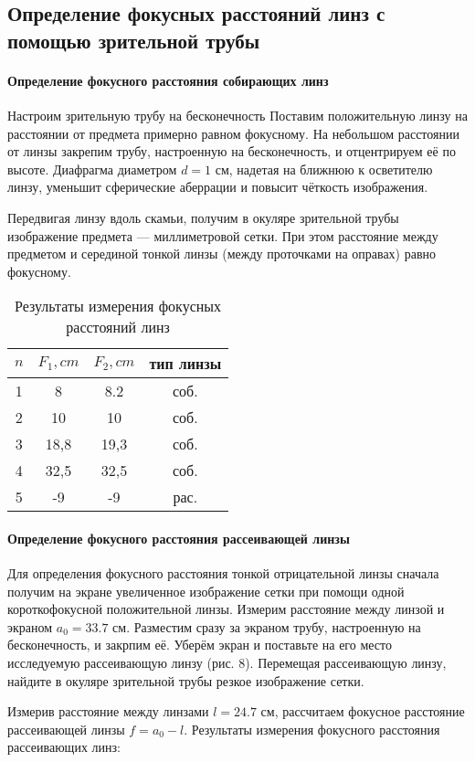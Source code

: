 \subsection{Определение фокусных расстояний линз с помощью зрительной трубы}
\paragraph{Определение фокусного расстояния собирающих линз}


Настроим зрительную трубу на бесконечность
Поставим положительную линзу на расстоянии от предмета примерно равном фокусному. На небольшом расстоянии от линзы закрепим трубу, настроенную на бесконечность,
и отцентрируем её по высоте. Диафрагма диаметром $d = 1$ см, надетая на ближнюю к осветителю линзу, уменьшит сферические аберрации и повысит чёткость изображения.

Передвигая линзу вдоль скамьи, получим в окуляре зрительной трубы изображение предмета — миллиметровой сетки. При этом расстояние между предметом и серединой тонкой линзы (между проточками на оправах) равно фокусному.

    \begin{table}[h!]
      \caption{Результаты измерения фокусных расстояний линз}
        \centering
            \begin{tabular}{| c | c | c | c |}

                \hline
                    $n$ & $F_1, cm$ & $F_2, cm$ &  тип линзы\\
                \hline
                    1 & 8 & 8.2 & соб. \\
                \hline
                    2 & 10 & 10 & соб.\\
                \hline
                    3 & 18,8 & 19,3  & соб. \\
                \hline
                    4 & 32,5 & 32,5 & соб. \\
                \hline
                    5 & -9 & -9 &  рас.\\
                \hline
                \end{tabular}
        \label{nu1}
    \end{table}

\paragraph{Определение фокусного расстояния рассеивающей линзы}


Для определения фокусного расстояния тонкой отрицательной линзы сначала получим на экране увеличенное изображение сетки при помощи одной короткофокусной положительной линзы. Измерим расстояние между линзой и экраном $a_0 = 33.7$ см.
Разместим сразу за экраном трубу, настроенную на бесконечность, и закрпим её. Уберём экран и поставьте на его место исследуемую рассеивающую линзу (рис. 8). Перемещая рассеивающую линзу, найдите в окуляре зрительной трубы резкое изображение сетки. \par
Измерив расстояние между линзами $l = 24.7$ см, рассчитаем фокусное расстояние рассеивающей линзы $f = a_0 - l$.
Результаты измерения фокусного расстояния рассеивающих линз:

